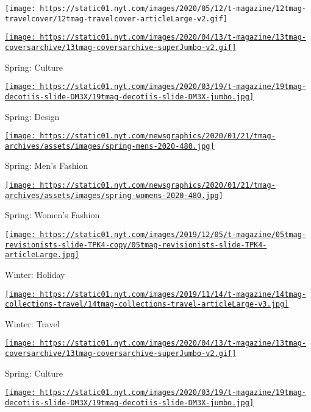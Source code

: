 \texttt{[image: https://static01.nyt.com/images/2020/05/12/t-magazine/12tmag-travelcover/12tmag-travelcover-articleLarge-v2.gif]}

\href{https://www.nytimes.com/issue/t-magazine/2020/04/12/ts-april-19-culture-issue}{\texttt{[image: https://static01.nyt.com/images/2020/04/13/t-magazine/13tmag-coversarchive/13tmag-coversarchive-superJumbo-v2.gif]}}

Spring: Culture

\href{https://www.nytimes.com/issue/t-magazine/2020/03/06/ts-march-22-design-issue}{\texttt{[image: https://static01.nyt.com/images/2020/03/19/t-magazine/19tmag-decotiis-slide-DM3X/19tmag-decotiis-slide-DM3X-jumbo.jpg]}}

Spring: Design

\href{https://www.nytimes.com/issue/t-magazine/2020/02/21/ts-march-8-mens-fashion-issue}{\texttt{[image: https://static01.nyt.com/newsgraphics/2020/01/21/tmag-archives/assets/images/spring-mens-2020-480.jpg]}}

Spring: Men's Fashion

\href{https://www.nytimes.com/issue/t-magazine/2020/02/06/ts-feb-23-womens-fashion-issue}{\texttt{[image: https://static01.nyt.com/newsgraphics/2020/01/21/tmag-archives/assets/images/spring-womens-2020-480.jpg]}}

Spring: Women's Fashion

\href{https://www.nytimes.com/issue/t-magazine/2019/11/21/ts-dec-8-holiday-issue}{\texttt{[image: https://static01.nyt.com/images/2019/12/05/t-magazine/05tmag-revisionists-slide-TPK4-copy/05tmag-revisionists-slide-TPK4-articleLarge.jpg]}}

Winter: Holiday

\href{https://www.nytimes.com/issue/t-magazine/2019/11/04/ts-nov-17-travel-issue}{\texttt{[image: https://static01.nyt.com/images/2019/11/14/t-magazine/14tmag-collections-travel/14tmag-collections-travel-articleLarge-v3.jpg]}}

Winter: Travel

\href{https://www.nytimes.com/issue/t-magazine/2020/04/12/ts-april-19-culture-issue}{\texttt{[image: https://static01.nyt.com/images/2020/04/13/t-magazine/13tmag-coversarchive/13tmag-coversarchive-superJumbo-v2.gif]}}

Spring: Culture

\href{https://www.nytimes.com/issue/t-magazine/2020/03/06/ts-march-22-design-issue}{\texttt{[image: https://static01.nyt.com/images/2020/03/19/t-magazine/19tmag-decotiis-slide-DM3X/19tmag-decotiis-slide-DM3X-jumbo.jpg]}}

